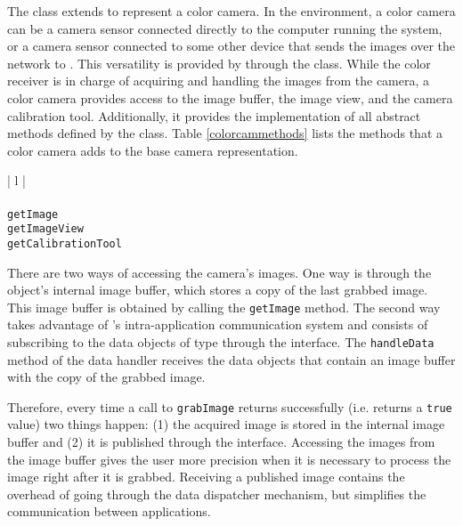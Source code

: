 The \ColorCam{} class extends \Camera{} to represent a color camera. In the \RD{} environment, a color
camera can be a camera sensor connected directly to the computer running the system, or a camera sensor
connected to some other device that sends the images over the network to \RD{}. This versatility is provided 
by \ColorCam{} through the \ColorReceiver{} class. While the color receiver is in charge of acquiring and 
handling the images from the camera, a color camera provides access to the image buffer, the image view, 
and the camera calibration tool. Additionally, it provides the implementation of all abstract methods defined 
by the \Camera{} class. Table \ref{colorcammethods} lists the methods that a color camera adds to the 
base camera representation.

\begin{table}[ht]
\caption{Public methods in the \ColorCam{} class}
\begin{center}
\begin{tabular}{| l |}
	\hline 
	 \\
	 \\
	\hline \hline
	\texttt{getImage} \\
	\texttt{getImageView} \\
	\texttt{getCalibrationTool} \\
	\hline
\end{tabular}
\end{center}
\label{colorcammethods}
\end{table}

There are two ways of accessing the camera's images. One way is through the \ColorCam{} object's internal 
image buffer, which stores a copy of the last grabbed image. This image buffer is obtained by calling the
\texttt{get\-Im\-age} method. The second way takes advantage of \RD{}'s intra-application communication 
system and consists of subscribing to the data objects of type \ColorCamData{} through the \DataHandler{} 
interface. The \texttt{han\-dle\-Da\-ta} method of the data handler receives the data objects that contain an 
image buffer with the copy of the grabbed image.

Therefore, every time a call to \texttt{grab\-Im\-age} returns successfully (i.e. returns a \texttt{true} value) two 
things happen: (1) the acquired image is stored in the internal image buffer and (2) it is published through the 
\DataProvider{} interface. Accessing the images from the image buffer gives the user more precision when it
is necessary to process the image right after it is grabbed. Receiving a published image contains the 
overhead of going through the data dispatcher mechanism, but simplifies the communication between
\RD{} applications. 

